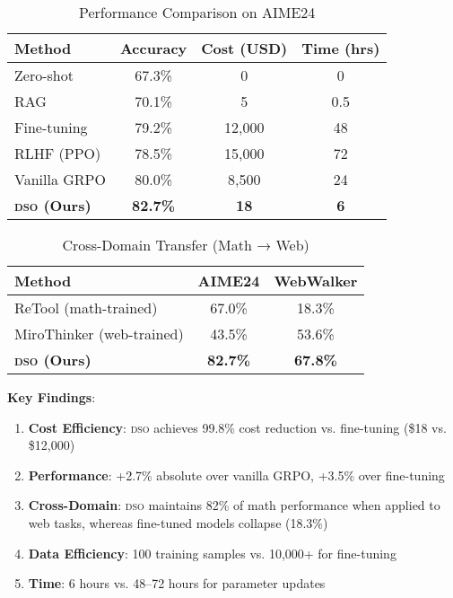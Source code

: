 \documentclass[11pt,letterpaper]{article}
\newcommand{\DSO}{\textsc{dso}}
\begin{document}
\begin{table}[t]
\centering
\caption{Performance Comparison on AIME24}
\label{tab:results-aime}
\begin{tabular}{lccc}
\toprule
\textbf{Method} & \textbf{Accuracy} & \textbf{Cost (USD)} & \textbf{Time (hrs)} \\
\midrule
Zero-shot & 67.3\% & 0 & 0 \\
RAG & 70.1\% & 5 & 0.5 \\
Fine-tuning & 79.2\% & 12,000 & 48 \\
RLHF (PPO) & 78.5\% & 15,000 & 72 \\
Vanilla GRPO & 80.0\% & 8,500 & 24 \\
\textbf{\DSO{} (Ours)} & \textbf{82.7\%} & \textbf{18} & \textbf{6} \\
\bottomrule
\end{tabular}
\end{table}

\begin{table}[t]
\centering
\caption{Cross-Domain Transfer (Math → Web)}
\label{tab:transfer}
\begin{tabular}{lcc}
\toprule
\textbf{Method} & \textbf{AIME24} & \textbf{WebWalker} \\
\midrule
ReTool (math-trained) & 67.0\% & 18.3\% \\
MiroThinker (web-trained) & 43.5\% & 53.6\% \\
\textbf{\DSO{} (Ours)} & \textbf{82.7\%} & \textbf{67.8\%} \\
\bottomrule
\end{tabular}
\end{table}

\textbf{Key Findings}:

\begin{enumerate}
    \item \textbf{Cost Efficiency}: \DSO{} achieves 99.8\% cost reduction vs. fine-tuning (\$18 vs. \$12,000)
    
    \item \textbf{Performance}: +2.7\% absolute over vanilla GRPO, +3.5\% over fine-tuning
    
    \item \textbf{Cross-Domain}: \DSO{} maintains 82\% of math performance when applied to web tasks, whereas fine-tuned models collapse (18.3\%)
    
    \item \textbf{Data Efficiency}: 100 training samples vs. 10,000+ for fine-tuning
    
    \item \textbf{Time}: 6 hours vs. 48--72 hours for parameter updates
\end{enumerate}
\end{document}
